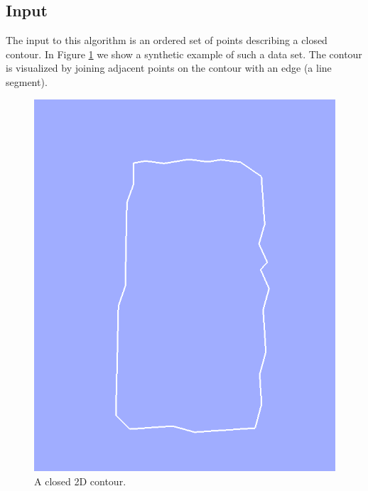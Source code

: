 \documentclass{InsightArticle}
\begin{document}
\subsection{Input}
\label{sec:Algorithm:Input}
The input to this algorithm is an ordered set of points describing a closed contour. In Figure \ref{fig:Input} we show a synthetic example of such a data set. The contour is visualized by joining adjacent points on the contour with an edge (a line segment).

\begin{figure}[H]
  \centering
  \includegraphics[width=0.3\linewidth]{images/input}
  \caption{A closed 2D contour.}
  \label{fig:Input}
\end{figure}

\end{document}
